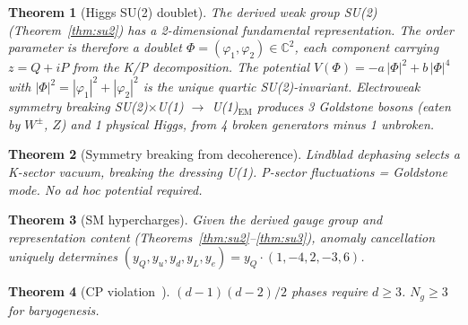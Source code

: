 \documentclass[12pt,a4paper]{article}
\newtheorem{theorem}{Theorem}
\begin{document}
\begin{theorem}[Higgs SU(2) doublet]
\label{thm:higgs_doublet}
The derived weak group SU(2) (Theorem~\ref{thm:su2}) has a 2-dimensional fundamental representation. The order parameter is therefore a doublet $\Phi = (\varphi_1, \varphi_2) \in \mathbb{C}^2$, each component carrying $z = Q + iP$ from the K/P decomposition. The potential $V(\Phi) = -a\,|\Phi|^2 + b\,|\Phi|^4$ with $|\Phi|^2 = |\varphi_1|^2 + |\varphi_2|^2$ is the unique quartic SU(2)-invariant. Electroweak symmetry breaking SU(2)$\times$U(1) $\to$ U(1)$_\mathrm{EM}$ produces 3 Goldstone bosons (eaten by $W^\pm$, $Z$) and 1 physical Higgs, from 4 broken generators minus 1 unbroken.
\end{theorem}

\begin{theorem}[Symmetry breaking from decoherence]
\label{thm:ssb}
Lindblad dephasing selects a K-sector vacuum, breaking the dressing U(1). P-sector fluctuations = Goldstone mode. No ad hoc potential required.
\end{theorem}

\begin{theorem}[SM hypercharges]
\label{thm:anomaly}
Given the derived gauge group and representation content (Theorems~\ref{thm:su2}--\ref{thm:su3}), anomaly cancellation uniquely determines $(y_Q, y_u, y_d, y_L, y_e) = y_Q \cdot (1, -4, 2, -3, 6)$.
\end{theorem}

\begin{theorem}[CP violation~\cite{km}]
\label{thm:cp}
$(d-1)(d-2)/2$ phases require $d \geq 3$. $N_g \geq 3$ for baryogenesis.
\end{theorem}
\end{document}
